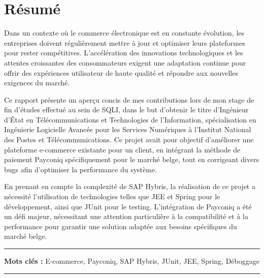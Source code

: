 

\chapter*{Résumé}

Dans un contexte où le commerce électronique est en constante évolution, les entreprises doivent régulièrement mettre à jour et optimiser leurs plateformes pour rester compétitives. L'accélération des innovations technologiques et les attentes croissantes des consommateurs exigent une adaptation continue pour offrir des expériences utilisateur de haute qualité et répondre aux nouvelles exigences du marché. \\
\vspace{10pt}


Ce rapport présente un aperçu concis de mes contributions lors de mon stage de fin d'études effectué au sein de SQLI, dans le but d'obtenir le titre d'Ingénieur d'État en Télécommunications et Technologies de l'Information, spécialisation en Ingénierie Logicielle Avancée pour les Services Numériques à l'Institut National des Postes et Télécommunications. Ce projet avait pour objectif d'améliorer une plateforme e-commerce existante pour un client, en intégrant la méthode de paiement Payconiq spécifiquement pour le marché belge, tout en corrigeant divers bugs afin d'optimiser la performance du système.\\
\vspace{10pt}

En prenant en compte la complexité de SAP Hybris, la réalisation de ce projet a nécessité l'utilisation de technologies telles que JEE et Spring pour le développement, ainsi que JUnit pour le testing. L'intégration de Payconiq a été un défi majeur, nécessitant une attention particulière à la compatibilité et à la performance pour garantir une solution adaptée aux besoins spécifiques du marché belge.
\vspace{10pt}

\noindent\rule[2pt]{\textwidth}{0.5pt}

{\textbf{Mots clés :}}
E-commerce, Payconiq, SAP Hybris, JUnit, JEE, Spring, Déboggage
\\
\noindent\rule[2pt]{\textwidth}{0.5pt}